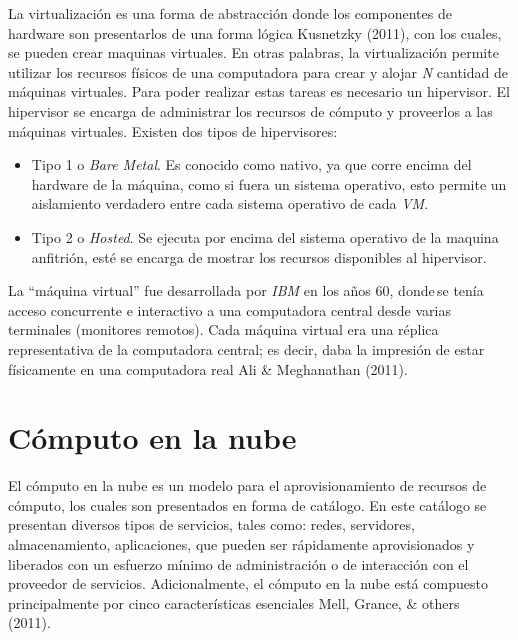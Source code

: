 \documentclass[12pt,twoside]{reedthesis}
\theoremstyle{definition}
\theoremstyle{definition}
\theoremstyle{definition}
\theoremstyle{remark}
\begin{document}
La virtualización es una forma de abstracción donde los componentes de
hardware son presentarlos de una forma lógica Kusnetzky (2011), con los
cuales, se pueden crear maquinas virtuales. En otras palabras, la
virtualización permite utilizar los recursos físicos de una computadora
para crear y alojar \emph{N} cantidad de máquinas virtuales. Para poder
realizar estas tareas es necesario un hipervisor. El hipervisor se
encarga de administrar los recursos de cómputo y proveerlos a las
máquinas virtuales. Existen dos tipos de hipervisores:
\begin{itemize}
\item
  Tipo 1 o \emph{Bare Metal}. Es conocido como nativo, ya que corre
  encima del hardware de la máquina, como si fuera un sistema operativo,
  esto permite un aislamiento verdadero entre cada sistema operativo de
  cada \emph{VM}.
\item
  Tipo 2 o \emph{Hosted}. Se ejecuta por encima del sistema operativo de
  la maquina anfitrión, esté se encarga de mostrar los recursos
  disponibles al hipervisor.
\end{itemize}
La ``máquina virtual'' fue desarrollada por \emph{IBM} en los años 60,
donde\,se tenía acceso concurrente e interactivo a una computadora
central desde varias terminales (monitores remotos). Cada máquina
virtual era una réplica representativa de la computadora central; es
decir, daba la impresión de estar físicamente en una computadora real
Ali \& Meghanathan (2011).~

\hypertarget{computo-en-la-nube}{%
\section{Cómputo en la nube}\label{computo-en-la-nube}}

El cómputo en la nube es un modelo para el aprovisionamiento de recursos
de cómputo, los cuales son presentados en forma de catálogo. En este
catálogo se presentan diversos tipos de servicios, tales como: redes,
servidores, almacenamiento, aplicaciones, que pueden ser rápidamente
aprovisionados y liberados con un esfuerzo mínimo de administración o de
interacción con el proveedor de servicios. Adicionalmente, el cómputo en
la nube está compuesto principalmente por cinco características
esenciales Mell, Grance, \& others (2011).~~
\end{document}
